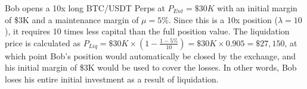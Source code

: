 \begin{example}\label{ex:funding2}
	Bob opens a 10x long BTC/USDT Perps at \(P_{Ent} = \$30K\) with an initial margin of \$3K and a maintenance margin of \(\mu = 5\%\). Since this is a 10x position (\(\lambda = 10\)), it requires 10 times less capital than the full position value. The liquidation price is calculated as \(P_{Liq} = \$30K \times ( 1 - \frac{1 - 5\%}{10} ) = \$30K \times 0.905 = \$27,150\), at which point Bob’s position would automatically be closed by the exchange, and his initial margin of \$3K would be used to cover the losses. In other words, Bob loses his entire initial investment as a result of liquidation.
\end{example}